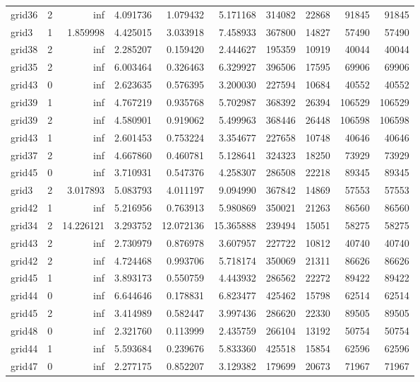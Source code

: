 \begin{longtable}{|l|r|r|r|r|r|r|r|r|r|}
grid36 & 2 & inf & 4.091736 & 1.079432 & 5.171168 & 314082 & 22868 & 91845 & 91845 \\
grid3 & 1 & 1.859998 & 4.425015 & 3.033918 & 7.458933 & 367800 & 14827 & 57490 & 57490 \\
grid38 & 2 & inf & 2.285207 & 0.159420 & 2.444627 & 195359 & 10919 & 40044 & 40044 \\
grid35 & 2 & inf & 6.003464 & 0.326463 & 6.329927 & 396506 & 17595 & 69906 & 69906 \\
grid43 & 0 & inf & 2.623635 & 0.576395 & 3.200030 & 227594 & 10684 & 40552 & 40552 \\
grid39 & 1 & inf & 4.767219 & 0.935768 & 5.702987 & 368392 & 26394 & 106529 & 106529 \\
grid39 & 2 & inf & 4.580901 & 0.919062 & 5.499963 & 368446 & 26448 & 106598 & 106598 \\
grid43 & 1 & inf & 2.601453 & 0.753224 & 3.354677 & 227658 & 10748 & 40646 & 40646 \\
grid37 & 2 & inf & 4.667860 & 0.460781 & 5.128641 & 324323 & 18250 & 73929 & 73929 \\
grid45 & 0 & inf & 3.710931 & 0.547376 & 4.258307 & 286508 & 22218 & 89345 & 89345 \\
grid3 & 2 & 3.017893 & 5.083793 & 4.011197 & 9.094990 & 367842 & 14869 & 57553 & 57553 \\
grid42 & 1 & inf & 5.216956 & 0.763913 & 5.980869 & 350021 & 21263 & 86560 & 86560 \\
grid34 & 2 & 14.226121 & 3.293752 & 12.072136 & 15.365888 & 239494 & 15051 & 58275 & 58275 \\
grid43 & 2 & inf & 2.730979 & 0.876978 & 3.607957 & 227722 & 10812 & 40740 & 40740 \\
grid42 & 2 & inf & 4.724468 & 0.993706 & 5.718174 & 350069 & 21311 & 86626 & 86626 \\
grid45 & 1 & inf & 3.893173 & 0.550759 & 4.443932 & 286562 & 22272 & 89422 & 89422 \\
grid44 & 0 & inf & 6.644646 & 0.178831 & 6.823477 & 425462 & 15798 & 62514 & 62514 \\
grid45 & 2 & inf & 3.414989 & 0.582447 & 3.997436 & 286620 & 22330 & 89505 & 89505 \\
grid48 & 0 & inf & 2.321760 & 0.113999 & 2.435759 & 266104 & 13192 & 50754 & 50754 \\
grid44 & 1 & inf & 5.593684 & 0.239676 & 5.833360 & 425518 & 15854 & 62596 & 62596 \\
grid47 & 0 & inf & 2.277175 & 0.852207 & 3.129382 & 179699 & 20673 & 71967 & 71967 \\

\end{longtable}
